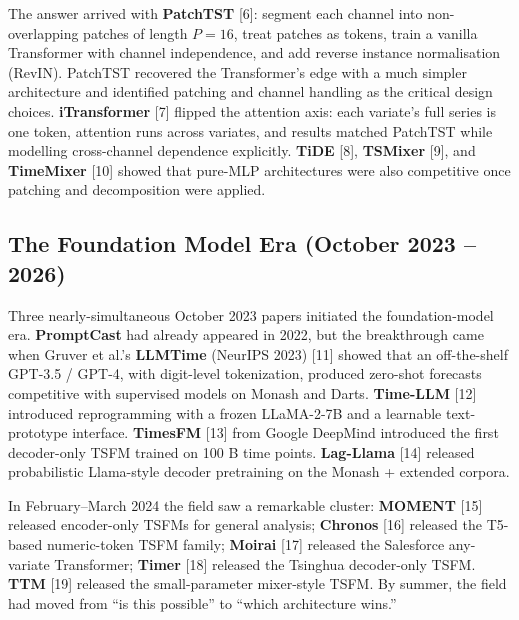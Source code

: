 \documentclass{article}
\begin{document}
The answer arrived with \textbf{PatchTST} \citep{nie2023atimeseriesisworth} {[}6{]}: segment each channel into non-overlapping patches of length \(P=16\), treat patches as tokens, train a vanilla Transformer with channel independence, and add reverse instance normalisation (RevIN). PatchTST recovered the Transformer's edge with a much simpler architecture and identified patching and channel handling as the critical design choices. \textbf{iTransformer} \citep{liu2024itransformerinvert} {[}7{]} flipped the attention axis: each variate's full series is one token, attention runs across variates, and results matched PatchTST while modelling cross-channel dependence explicitly. \textbf{TiDE} \citep{das2023longtermforecastin} {[}8{]}, \textbf{TSMixer} \citep{ekambaram2023tsmixerlightweight} {[}9{]}, and \textbf{TimeMixer} \citep{wang2024timemixerdecomposa} {[}10{]} showed that pure-MLP architectures were also competitive once patching and decomposition were applied.

\subsection{The Foundation Model Era (October 2023 -- 2026)}\label{the-foundation-model-era-october-2023-2026}

Three nearly-simultaneous October 2023 papers initiated the foundation-model era. \textbf{PromptCast} had already appeared in 2022, but the breakthrough came when Gruver et al.'s \textbf{LLMTime} (NeurIPS 2023) {[}11{]} showed that an off-the-shelf GPT-3.5 / GPT-4, with digit-level tokenization, produced zero-shot forecasts competitive with supervised models on Monash and Darts. \textbf{Time-LLM} \citep{jin2024timellmtimeseriesf} {[}12{]} introduced reprogramming with a frozen LLaMA-2-7B and a learnable text-prototype interface. \textbf{TimesFM} \citep{das2023longtermforecastin} {[}13{]} from Google DeepMind introduced the first decoder-only TSFM trained on 100 B time points. \textbf{Lag-Llama} \citep{rasul20232023} {[}14{]} released probabilistic Llama-style decoder pretraining on the Monash + extended corpora.

In February--March 2024 the field saw a remarkable cluster: \textbf{MOMENT} \citep{goswami2024momentafamilyofope} {[}15{]} released encoder-only TSFMs for general analysis; \textbf{Chronos} \citep{ansari20242024} {[}16{]} released the T5-based numeric-token TSFM family; \textbf{Moirai} \citep{woo2024unifiedtrainingofu} {[}17{]} released the Salesforce any-variate Transformer; \textbf{Timer} \citep{liu2024itransformerinvert} {[}18{]} released the Tsinghua decoder-only TSFM. \textbf{TTM} \citep{ekambaram2024tinytimemixersttms} {[}19{]} released the small-parameter mixer-style TSFM. By summer, the field had moved from ``is this possible'' to ``which architecture wins.''
\end{document}
